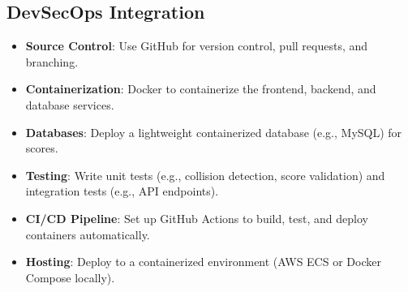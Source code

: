 \subsection*{DevSecOps Integration}
\begin{itemize}
    \item \textbf{Source Control}: Use GitHub for version control, pull requests, and branching.
    \item \textbf{Containerization}: Docker to containerize the frontend, backend, and database services.
    \item \textbf{Databases}: Deploy a lightweight containerized database (e.g., MySQL) for scores.
    \item \textbf{Testing}: Write unit tests (e.g., collision detection, score validation) and integration tests (e.g., API endpoints).
    \item \textbf{CI/CD Pipeline}: Set up GitHub Actions to build, test, and deploy containers automatically.
    \item \textbf{Hosting}: Deploy to a containerized environment (AWS ECS or Docker Compose locally).
\end{itemize}
